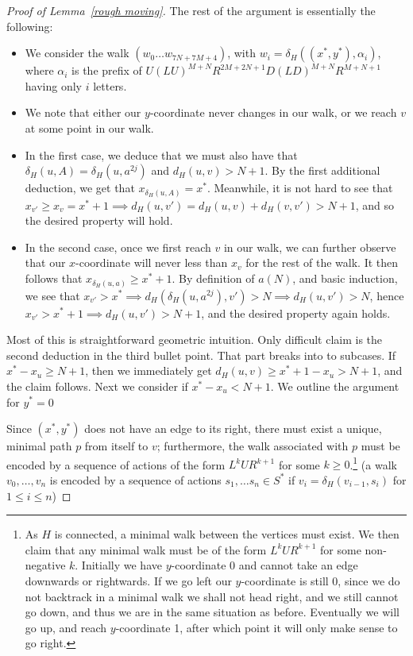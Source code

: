 \documentclass[a4paper]{article}
\theoremstyle{definition}
\begin{document}
\begin{proof}[Proof of Lemma~\ref*{rough moving}]
    The rest of the argument is essentially the following: 
    \begin{itemize}
        \item We consider the walk $(w_0\dots w_{7N+7M+4})$, with $w_i = \delta_H((x^*,y^*),\alpha_i)$, where $\alpha_i$ is the prefix of $U(LU)^{M+N}R^{2M+2N+1}D (LD)^{M+N}R^{M+N+1}$ having only $i$ letters.
        \item We note that either our $y$-coordinate never changes in our walk, or we reach $v$ at some point in our walk.
        \item In the first case, we deduce that we must also have that $\delta_H(u,A) = \delta_H(u,a^{2j})$ and $d_H(u,v) > N+1$. By the first additional deduction, we get that $x_{\delta_H(u,A)}=x^*$. Meanwhile, it is not hard to see that $x_{v'}\ge x_v =x^*+1\implies d_H(u,v') = d_H(u,v) + d_H(v,v') >N+1$, and so the desired property will hold.  
        \item In the second case, once we first reach $v$ in our walk, we can further observe that our $x$-coordinate will never less than $x_v$ for the rest of the walk. It then follows that $x_{\delta_H(u,a)} \ge x^*+1$. By definition of $a(N)$, and basic induction, we see that $x_{v'} > x^* \implies d_H(\delta_H(u,a^{2j}),v') > N \implies d_H(u,v') > N$, hence $x_{v'} > x^*+1 \implies d_H(u,v') > N+1$, and the desired property again holds. 
    \end{itemize}
    
    Most of this is straightforward geometric intuition. Only difficult claim is the second deduction in the third bullet point. That part breaks into to subcases. If $x^*-x_u\ge N+1$, then we immediately get $d_H(u,v) \ge x^*+1-x_u > N+1$, and the claim follows. Next we consider if $x^*-x_u < N+1$. We outline the argument for $y^*=0$
    
    
    Since $(x^*,y^*)$ does not have an edge to its right, there must exist a unique, minimal path $p$ from itself to $v$; furthermore, the walk associated with $p$ must be encoded by a sequence of actions of the form $L^kUR^{k+1}$ for some $k\ge 0$.\footnote{As $H$ is connected, a minimal walk between the vertices must exist. We then claim that any minimal walk must be of the form $L^kUR^{k+1}$ for some non-negative $k$. Initially we have $y$-coordinate 0 and cannot take an edge downwards or rightwards. If we go left our $y$-coordinate is still 0, since we do not backtrack in a minimal walk we shall not head right, and we still cannot go down, and thus we are in the same situation as before. Eventually we will go up, and reach $y$-coordinate 1, after which point it will only make sense to go right.} (a walk $v_0,\dots ,v_n$ is encoded by a sequence of actions $s_1,\dots s_n \in S^*$ if $v_{i} = \delta_H(v_{i-1},s_i)$ for $1\le i\le n$) 
    

\end{proof}
\end{document}
